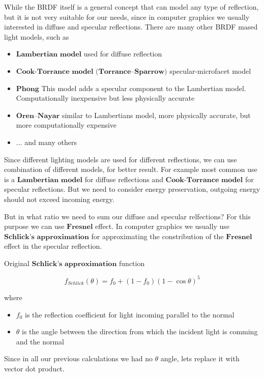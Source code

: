 \documentclass{article}
\begin{document}
While the BRDF itself is a general concept that can model any type 
of reflection, but it is not very suitable for our needs, 
since in computer graphics we usually interested in
diffuse and specular reflections. There are many other BRDF mased light
models, such as

\begin{itemize}
    \item $\textbf{Lambertian model}$ used for diffuse reflection
    \item $\textbf{Cook-Torrance model (Torrance–Sparrow)}$ specular-microfacet model
    \item $\textbf{Phong}$ This model adds a specular component to the Lambertian model. Computationally inexpensive but less physically accurate
    \item $\textbf{Oren–Nayar}$ similar to Lambertians model, more physically accurate, but more computationally expensive
    \item ... and many others
\end{itemize}

Since different lighting models are used for different reflections,
we can use combination of different models, for better result. For example most common use is a
$\textbf{Lambertian model}$ for diffuse reflections and $\textbf{Cook-Torrance model}$ for specular reflections. 
But we need to consider energy preservation, outgoing energy should not exceed incoming energy.

But in what ratio we need to sum our diffuse and specular relfections? For this purpose
we can use $\textbf{Fresnel}$ effect. In computer graphics we usually use 
$\textbf{Schlick's approximation}$ for approximating the constribution of the $\textbf{Fresnel}$ effect in the
specular reflection.

Original $\textbf{Schlick's approximation}$ function

\[
    f_{Schlick}(\theta) = f_{0} + (1 - f_{0})(1 - \cos{\theta})^5
\]

where
\begin{itemize}
    \item $f_{0}$ is the reflection coefficient for light incoming parallel to the normal
    \item $\theta$ is the angle between the direction from which the incident light is comming and the normal
\end{itemize}

Since in all our previous calculations we had no $\theta$ angle, lets replace it with vector dot product.
\end{document}
